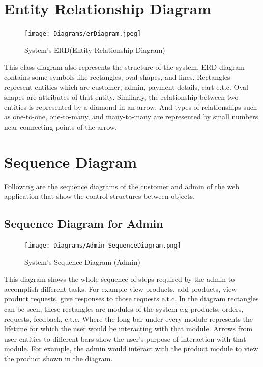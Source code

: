\section{Entity Relationship Diagram}
\begin{figure}[H]
    \centering
    \texttt{[image: Diagrams/erDiagram.jpeg]}
    \caption{System’s ERD(Entity Relationship Diagram)}
    \label{fig:System’s ERD(Entity Relationship Diagram)}
   
    \end{figure}
    \justifying
    This class diagram also represents the structure of the system. ERD diagram contains some symbols like rectangles, oval shapes, and lines. Rectangles represent entities which are customer, admin, payment details, cart e.t.c. Oval shapes are attributes of that entity. Similarly, the relationship between two entities is represented by a diamond in an arrow. And types of relationships such as one-to-one, one-to-many, and many-to-many are represented by small numbers near connecting points of the arrow. 


\section{Sequence Diagram}
Following are the sequence diagrams of the customer and admin of the web application that show the control structures between objects.
\subsection{Sequence Diagram for Admin}
\begin{figure}[H]
    \centering
    \texttt{[image: Diagrams/Admin\_SequenceDiagram.png]}
    \caption{System’s Sequence Diagram (Admin)}
    \label{fig: System’s Sequence Diagram (Admin)}

\end{figure}
\justifying
 This diagram shows the whole sequence of steps required by the admin to accomplish different tasks. For example view products, add products, view product requests, give responses to those requests e.t.c. In the diagram rectangles can be seen, these rectangles are modules of the system e.g products, orders, requests, feedback, e.t.c. Where the long bar under every module represents the lifetime for which the user would be interacting with that module. Arrows from user entities to different bars show the user’s purpose of interaction with that module. For example, the admin would interact with the product module to view the product shown in the diagram.
